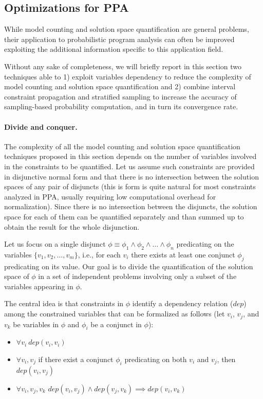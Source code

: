 \subsection{Optimizations for PPA}\label{sec:computingprobabilitiesOptimizations}

While model counting and solution space quantification are general problems, their application to probabilistic program analysis can often be improved exploiting the additional information specific to this application field.

Without any sake of completeness, we will briefly report in this section two techniques able to 1) exploit variables dependency to reduce the complexity of model counting and solution space quantification and 2) combine interval constraint propagation and stratified sampling to increase the accuracy of sampling-based probability computation, and in turn its convergence rate.


\paragraph{Divide and conquer.}
The complexity of all the model counting and solution space quantification techniques proposed in this section depends on the number of variables involved in the constraints to be quantified. Let us assume such constraints are provided in disjunctive normal form and that there is no intersection between the solution spaces of any pair of disjuncts (this is form is quite natural for most constraints analyzed in PPA, usually requiring low computational overhead for normalization). Since there is no intersection between the disjuncts, the solution space for each of them can be quantified separately and than summed up to obtain the result for the whole disjunction.

Let us focus on a single disjunct $\phi \equiv \phi_1 \land \phi_2 \land \dots \land \phi_n$ predicating on the variables $\{v_1, v_2, \dots, v_m\}$, i.e., for each $v_i$ there exists at least one conjunct $\phi_j$ predicating on its value. Our goal is to divide the quantification of the solution space of $\phi$ in a set of independent problems involving only a subset of the variables appearing in $\phi$. 

The central idea is that constraints in $\phi$ identify a dependency relation ($\textit{dep}$) among the constrained variables that can be formalized as follows (let $v_i$, $v_j$, and $v_k$ be variables in $\phi$ and $\phi_i$ be a conjunct in $\phi$):
\begin{itemize}
	\item $\forall v_i \ \textit{dep}(v_i,v_i)$
	\item $\forall v_i,v_j$ if there exist a conjunct $\phi_i$ predicating on both $v_i$ and $v_j$, then $\textit{dep}(v_i,v_j)$
	\item $\forall v_i,v_j,v_k$ $\textit{dep}(v_i,v_j) \land \textit{dep}(v_j,v_k) \implies \textit{dep}(v_i,v_k)$
\end{itemize}

